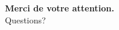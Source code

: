 \begin{frame}{}

    \vspace{1cm}
    \centering
    \Large \textbf{Merci de votre attention.} \\
    \small Questions?
\end{frame}